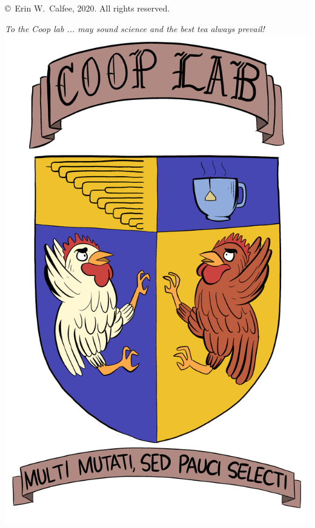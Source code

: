 % 
% 
% 
% 
%








   \frontmatter

   \pagestyle{prelim}
   
   
   \newpage
	
	 \thispagestyle{empty}
	 \begin{titlepage}
	 \vspace*{50em}
	 \begin{center}
		 \copyright \ Erin W.\ Calfee, 2020.  All rights reserved.  
	 \end{center}
	 \end{titlepage}
	 \newpage
	
	 \thispagestyle{plain}
	 \vspace*{10em}
	 \begin{center}
	 	 \textit{To the Coop lab ... may sound science and the best tea always prevail!}\\
	 	 \vspace*{5em}
	 	\includegraphics[width=.4\textwidth]{cooplablogo2.png}
	  
	 \end{center}
	 \newpage
   
